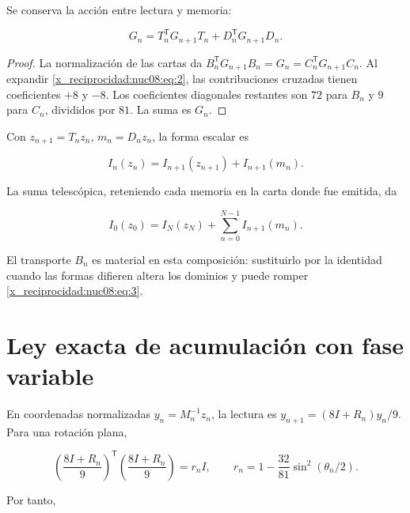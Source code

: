 \begin{theorem}
Se conserva la acción entre lectura y memoria:

\begin{equation}
\boxed{G_n=T_n^\mathsf TG_{n+1}T_n+D_n^\mathsf TG_{n+1}D_n.}
\label{x_reciprocidad:nuc08:eq:3}
\end{equation}
\end{theorem}

\begin{proof}
La normalización de las cartas da
\(B_n^\mathsf TG_{n+1}B_n=G_n=C_n^\mathsf TG_{n+1}C_n\).
Al expandir \eqref{x_reciprocidad:nuc08:eq:2}, las contribuciones cruzadas tienen coeficientes \(+8\) y \(-8\). Los coeficientes diagonales restantes son \(72\) para \(B_n\) y \(9\) para \(C_n\), divididos por \(81\). La suma es \(G_n\).
\end{proof}

Con \(z_{n+1}=T_nz_n\), \(m_n=D_nz_n\), la forma escalar es

\begin{equation}
\boxed{I_n(z_n)=I_{n+1}(z_{n+1})+I_{n+1}(m_n).}
\label{x_reciprocidad:nuc08:eq:4}
\end{equation}

La suma telescópica, reteniendo cada memoria en la carta donde fue emitida, da

\begin{equation}
I_0(z_0)=I_N(z_N)+\sum_{n=0}^{N-1}I_{n+1}(m_n).
\label{x_reciprocidad:nuc08:eq:5}
\end{equation}

El transporte \(B_n\) es material en esta composición: sustituirlo por la identidad cuando las formas difieren altera los dominios y puede romper \eqref{x_reciprocidad:nuc08:eq:3}.

\section{Ley exacta de acumulación con fase variable}

En coordenadas normalizadas \(y_n=M_n^{-1}z_n\), la lectura es
\(y_{n+1}=(8I+R_n)y_n/9\). Para una rotación plana,

\begin{equation}
\left(\frac{8I+R_n}{9}\right)^\mathsf T
\left(\frac{8I+R_n}{9}\right)=r_n I,\qquad
r_n=1-\frac{32}{81}\sin^2(\theta_n/2).
\label{x_reciprocidad:nuc08:eq:6}
\end{equation}

Por tanto,

